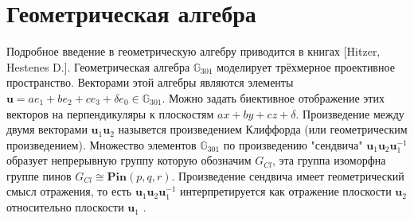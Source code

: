 





  \section{Геометрическая алгебра}

  Подробное введение в геометрическую алгебру приводится в книгах [Hitzer, Hestenes D.]. Геометрическая алгебра $\mathbb{G}_{301}$ моделирует трёхмерное проективное
  пространство. Векторами этой алгебры являются элементы $\mathbf{u} = ae_1+be_2+ce_3+\delta e_0 \in \mathbb{G}_{301}$. Можно задать биективное отображение этих векторов
  на перпендикуляры к плоскостям $ax+by+cz+\delta$. Произведение между двумя векторами $\mathbf{u}_1 \mathbf{u}_2$ назывется произведением Клиффорда 
  (или геометрическим произведением). Множество элементов $\mathbb{G}_{301}$ по произведению "сендвича" $\mathbf{u}_1 \mathbf{u}_2 \mathbf{u}_1^{-1}$ образует непрерывную
  группу которую обозначим $G_{Cl}$, эта группа изоморфна группе пинов $G_{Cl} \cong \mathbf{Pin}(p,q,r)$. Произведение сендвича имеет геометрический смысл отражения,
  то есть $\mathbf{u}_1 \mathbf{u}_2 \mathbf{u}_1^{-1}$ интерпретируется как отражение плоскости $\mathbf{u}_2$ относительно плоскости $\mathbf{u}_1$ 
  \autocite{ruheGeometricCliffordAlgebra2023}. 


